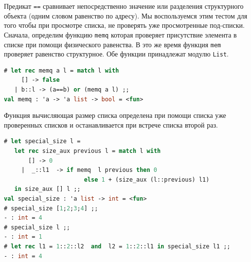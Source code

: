 Предикат \texttt{==} сравнивает непосредственно значение или разделения
структурного объекта (одним словом равенство по адресу). Мы воспользуемся этим
тестом для того чтобы при просмотре списка, не проверять уже просмотренные
под-списки. Сначала, определим функцию \texttt{memq} которая проверяет
присутствие элемента в списке при помощи физического равенства. В это же время
функция \texttt{mem} проверяет равенство структурное. Обе функции принадлежат
модулю \texttt{List}.

\begin{lstlisting}[language=OCaml]
# let rec memq a l = match l with
     [] -> false
   | b::l -> (a==b) or (memq a l) ;;
val memq : 'a -> 'a list -> bool = <fun>
\end{lstlisting}

Функция вычисляющая размер списка определена при помощи списка уже проверенных
списков и останавливается при встрече списка второй раз.

\begin{lstlisting}[language=OCaml]
# let special_size l =
   let rec size_aux previous l = match l with
       [] -> 0
     |  _::l1  -> if memq  l previous then 0
                       else 1 + (size_aux (l::previous) l1)
   in size_aux [] l ;;
val special_size : 'a list -> int = <fun>
# special_size [1;2;3;4] ;;
- : int = 4
# special_size l ;;
- : int = 1
# let rec l1 = 1::2::l2  and  l2 = 1::2::l1 in special_size l1 ;;
- : int = 4
\end{lstlisting}
